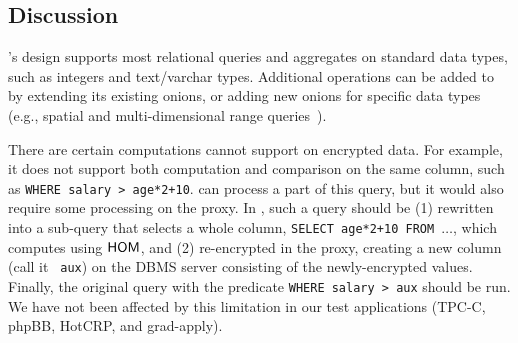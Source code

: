 \subsection{Discussion}

\name{}'s design supports most relational queries and aggregates on
standard data types, such as integers and text/varchar types.
Additional operations can be added to \name{} by extending its
existing onions, or adding new onions for specific data types (e.g.,
spatial and multi-dimensional range
queries~\cite{multidimRangeQueries}).

There are certain computations \name{} cannot support on encrypted
data. For example, it does not support both computation and comparison
on the same column, such as \texttt{WHERE salary > age*2+10}.  \name{}
can process a part of this query, but it would also require some
processing on the proxy.  In \name{}, such a query should be (1)
rewritten into a sub-query that selects a whole column, \texttt{SELECT
  age*2+10 FROM $\ldots$}, which \name{} computes using $\mathsf{HOM}$, and
(2) re-encrypted in the proxy, creating a new column (call it {\tt
  aux}) on the DBMS server consisting of the newly-encrypted values.
Finally, the original query with the predicate {\tt WHERE salary >
  aux} should be run.  We have not been affected by this limitation in
our test applications (TPC-C, phpBB, HotCRP, and grad-apply).


% 



